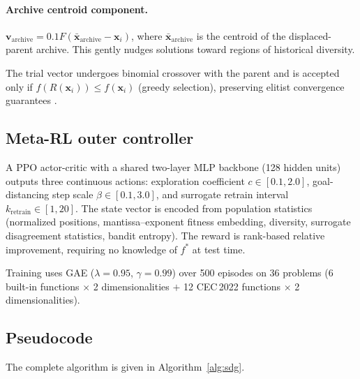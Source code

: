 \documentclass[preprint,12pt,number]{elsarticle}
\begin{document}
\paragraph{Archive centroid component.}
$\mathbf{v}_{\text{archive}} = 0.1 F (\bar{\mathbf{x}}_{\text{archive}} - \mathbf{x}_i)$, where $\bar{\mathbf{x}}_{\text{archive}}$ is the centroid of the displaced-parent archive. This gently nudges solutions toward regions of historical diversity.

The trial vector undergoes binomial crossover with the parent and is accepted only if $f(R(\mathbf{x}_i)) \leq f(\mathbf{x}_i)$ (greedy selection), preserving elitist convergence guarantees \cite{Rudolph1994}.

\subsection{Meta-RL outer controller}
\label{sec:metarl}

A PPO actor-critic \cite{Schulman2017} with a shared two-layer MLP backbone (128 hidden units) outputs three continuous actions: exploration coefficient $c \in [0.1, 2.0]$, goal-distancing step scale $\beta \in [0.1, 3.0]$, and surrogate retrain interval $k_{\text{retrain}} \in [1, 20]$. The state vector is encoded from population statistics (normalized positions, mantissa--exponent fitness embedding, diversity, surrogate disagreement statistics, bandit entropy). The reward is rank-based relative improvement, requiring no knowledge of $f^*$ at test time.

Training uses GAE ($\lambda = 0.95$, $\gamma = 0.99$) over 500 episodes on 36 problems (6 built-in functions $\times$ 2 dimensionalities $+$ 12 CEC\,2022 functions $\times$ 2 dimensionalities).

\subsection{Pseudocode}

The complete algorithm is given in Algorithm~\ref{alg:sdg}.
\end{document}
